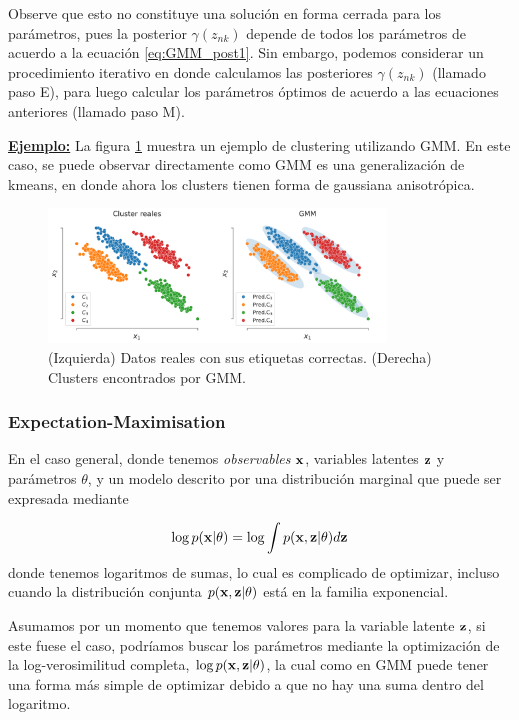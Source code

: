   Observe que esto no constituye una solución en forma cerrada para los parámetros, pues la posterior $\gamma(z_{nk})$ depende de todos los parámetros de acuerdo a la ecuación \eqref{eq:GMM_post1}. Sin embargo, podemos considerar un procedimiento iterativo en donde calculamos las posteriores $\gamma(z_{nk})$ (llamado paso E), para luego calcular los parámetros óptimos de acuerdo a las ecuaciones anteriores (llamado paso M). 



\underline{\textbf{Ejemplo:}} La figura \ref{fig:gmm} muestra un ejemplo de clustering utilizando GMM. En este caso, se puede observar directamente como GMM es una generalización de kmeans, en donde ahora los clusters tienen forma de gaussiana anisotrópica.

\begin{figure}[ht]
  \centering
  \includegraphics[width=0.8\textwidth]{img/cap7_gmm}
  \caption{(Izquierda) Datos reales con sus etiquetas correctas. (Derecha) Clusters encontrados por GMM.}
  \label{fig:gmm}
\end{figure}



\subsubsection{Expectation-Maximisation} 
\label{sub:GMM_EM}

En el caso general, donde tenemos \emph{observables} $\mathbf{x}$, variables latentes $\mathbf{z}$ y parámetros $\theta$, y un modelo descrito por una distribución marginal que puede ser expresada mediante 

\begin{equation}
	\log p(\mathbf{x}|\theta) = \log \int p(\mathbf{x},\mathbf{z}|\theta)d\mathbf{z}
\end{equation}
donde tenemos logaritmos de sumas, lo cual es complicado de optimizar, incluso cuando la distribución conjunta $p(\mathbf{x},\mathbf{z}|\theta)$ está en la familia exponencial.  

Asumamos por un momento que tenemos valores para la variable latente $\mathbf{z}$, si este fuese el caso, podríamos buscar los parámetros mediante la optimización de la log-verosimilitud completa, $\log p(\mathbf{x}, \mathbf{z} |\theta)$, la cual como en GMM puede tener una forma más simple de optimizar debido a que no hay una suma dentro del logaritmo. 


